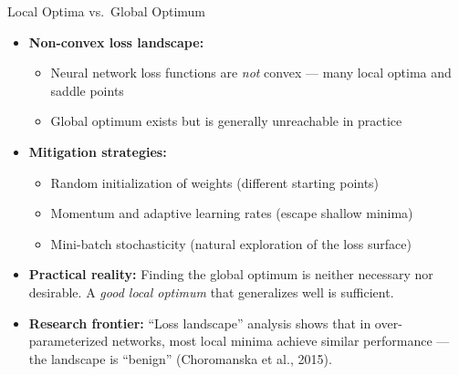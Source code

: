 \documentclass[10pt,english,aspectratio=169]{beamer}
\begin{document}
\begin{frame}{Local Optima vs.\ Global Optimum}
\begin{itemize}
\item \textbf{Non-convex loss landscape:}
\begin{itemize}
\item Neural network loss functions are \emph{not} convex --- many local optima and saddle points
\item Global optimum exists but is generally unreachable in practice
\end{itemize}

\medskip
\item \textbf{Mitigation strategies:}
\begin{itemize}
\item Random initialization of weights (different starting points)
\item Momentum and adaptive learning rates (escape shallow minima)
\item Mini-batch stochasticity (natural exploration of the loss surface)
\end{itemize}

\medskip
\item \textbf{Practical reality:} Finding the global optimum is neither necessary nor desirable. A \emph{good local optimum} that generalizes well is sufficient.

\medskip
\item \textbf{Research frontier:} ``Loss landscape'' analysis shows that in over-parameterized networks, most local minima achieve similar performance --- the landscape is ``benign'' (Choromanska et al., 2015).
\end{itemize}
\end{frame}
\end{document}
